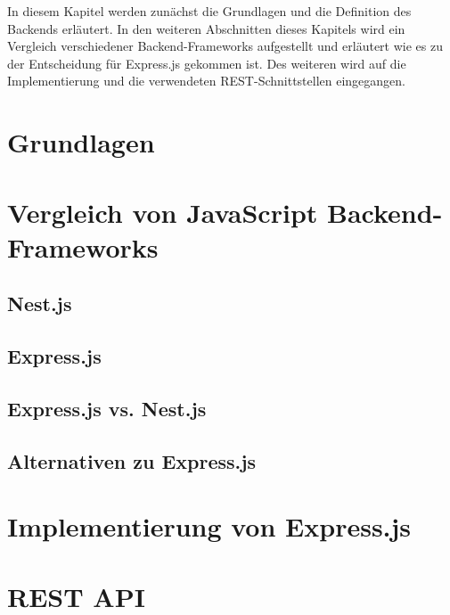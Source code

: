 In diesem Kapitel werden zunächst die Grundlagen und die Definition des Backends erläutert. In den weiteren Abschnitten dieses Kapitels wird ein Vergleich verschiedener Backend-Frameworks aufgestellt und erläutert wie es zu der Entscheidung für Express.js gekommen ist. Des weiteren wird auf die Implementierung und die verwendeten REST-Schnittstellen eingegangen.

\section{Grundlagen}


\section{Vergleich von JavaScript Backend-Frameworks}


\subsection{Nest.js}


\subsection{Express.js}


\subsection{Express.js vs. Nest.js}


\subsection{Alternativen zu Express.js}


\section{Implementierung von Express.js}


\section{REST API}


